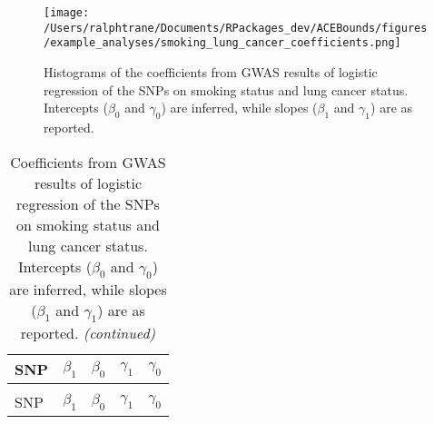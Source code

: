\documentclass[
]{article}
\theoremstyle{plain}
\begin{document}
\begin{figure}[H]
  \center
  \texttt{[image: /Users/ralphtrane/Documents/RPackages\_dev/ACEBounds/figures/example\_analyses/smoking\_lung\_cancer\_coefficients.png]}
  \caption{Histograms of the coefficients from GWAS results of logistic regression of the SNPs on smoking status and lung cancer status. Intercepts ($\beta_0$ and $\gamma_0$) are inferred, while slopes ($\beta_1$ and $\gamma_1$) are as reported.}
  \label{fig:marginal-distribution-of-coefficients-lung-cancer}
\end{figure}

\begin{longtable}[t]{lrrrr}
\caption{\label{tab:coefficients-lung-cancer}Coefficients from GWAS results of logistic regression of the SNPs on smoking status and lung cancer status. Intercepts ($\beta_0$ and $\gamma_0$) are inferred, while slopes ($\beta_1$ and $\gamma_1$) are as reported.}\\
\toprule
SNP & $\beta_1$ & $\beta_0$ & $\gamma_1$ & $\gamma_0$\\
\midrule
\endfirsthead
\caption[]{\label{tab:coefficients-lung-cancer}Coefficients from GWAS results of logistic regression of the SNPs on smoking status and lung cancer status. Intercepts ($\beta_0$ and $\gamma_0$) are inferred, while slopes ($\beta_1$ and $\gamma_1$) are as reported. \textit{(continued)}}\\
\toprule
SNP & $\beta_1$ & $\beta_0$ & $\gamma_1$ & $\gamma_0$\\
\midrule
\endhead


\end{longtable}
\end{document}
